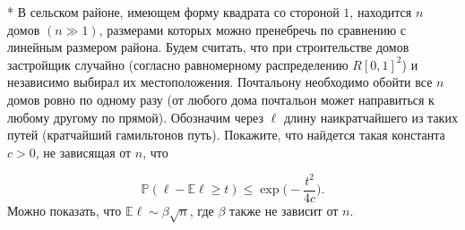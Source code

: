 \begin{problem}*
\label{talagran}
В сельском районе, имеющем форму квадрата со стороной $1$, находится $n$ домов $(n\gg 1)$, размерами которых можно пренебречь по сравнению с линейным размером района. Будем считать, что при строительстве домов застройщик случайно (согласно равномерному распределению $R[0,1]^2$)  и независимо выбирал их местоположения. Почтальону необходимо обойти все $n$ домов ровно по одному разу (от любого дома почтальон может направиться к любому другому по прямой). Обозначим через $\ell$ длину наикратчайшего из таких путей (кратчайший гамильтонов путь).
Покажите, что найдется такая константа $c>0$, не зависящая от $n$, что 

\begin{equation*}
\mathbb{P}(\ell - \mathbb{E}\ell \geq t)\leq \exp \biggl(-\frac{t^2}{4c}\biggr). 
\end{equation*}
Можно показать, что $\mathbb{E}\ell\sim\beta\sqrt{n}$, где $\beta$ также не зависит от $n$.

\end{problem}


